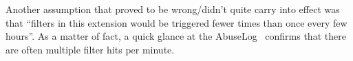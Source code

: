 Another assumption that proved to be wrong/didn't quite carry into effect was that ``filters in this extension would be triggered fewer times than once every few hours''.
As a matter of fact, a quick glance at the AbuseLog~\cite{Wikipedia:AbuseLog} confirms that there are often multiple filter hits per minute.

